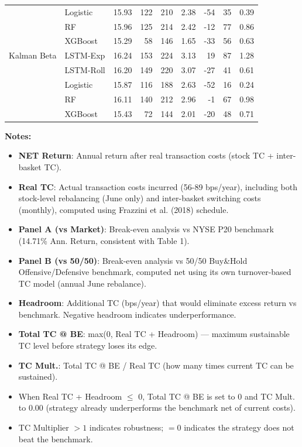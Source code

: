 \begin{table}[htbp]
{\begin{tabular}{l l r r r r r r r}
& Logistic & 15.93 & 122 & 210 & 2.38 & -54 & 35 & 0.39 \\
& RF & 15.96 & 125 & 214 & 2.42 & -12 & 77 & 0.86 \\
& XGBoost & 15.29 & 58 & 146 & 1.65 & -33 & 56 & 0.63 \\
\addlinespace
Kalman Beta & LSTM-Exp & 16.24 & 153 & 224 & 3.13 & 19 & 87 & 1.28 \\
& LSTM-Roll & 16.20 & 149 & 220 & 3.07 & -27 & 41 & 0.61 \\
& Logistic & 15.87 & 116 & 188 & 2.63 & -52 & 16 & 0.24 \\
& RF & 16.11 & 140 & 212 & 2.96 & -1 & 67 & 0.98 \\
& XGBoost & 15.43 & 72 & 144 & 2.01 & -20 & 48 & 0.71 \\
\bottomrule
\end{tabular}%
}
\vspace{0.3em}
\begin{minipage}{\textwidth}
\small
\textbf{Notes:}
\begin{itemize}[leftmargin=*, itemsep=0pt, parsep=0pt]
    \item \textbf{NET Return}: Annual return after real transaction costs (stock TC + inter-basket TC).
    \item \textbf{Real TC}: Actual transaction costs incurred (56-89 bps/year), including both stock-level rebalancing (June only) and inter-basket switching costs (monthly), computed using Frazzini et al. (2018) schedule.
    \item \textbf{Panel A (vs Market)}: Break-even analysis vs NYSE P20 benchmark (14.71\% Ann. Return, consistent with Table 1).
    \item \textbf{Panel B (vs 50/50)}: Break-even analysis vs 50/50 Buy\&Hold Offensive/Defensive benchmark, computed net using its own turnover-based TC model (annual June rebalance).
    \item \textbf{Headroom}: Additional TC (bps/year) that would eliminate excess return vs benchmark. Negative headroom indicates underperformance.
    \item \textbf{Total TC @ BE}: max(0, Real TC + Headroom) — maximum sustainable TC level before strategy loses its edge.
    \item \textbf{TC Mult.}: Total TC @ BE / Real TC (how many times current TC can be sustained).
    \item When Real TC + Headroom $\leq$ 0, Total TC @ BE is set to 0 and TC Mult. to 0.00 (strategy already underperforms the benchmark net of current costs).
    \item TC Multiplier $>1$ indicates robustness; $=0$ indicates the strategy does not beat the benchmark.
\end{itemize}
\end{minipage}
\end{table}
